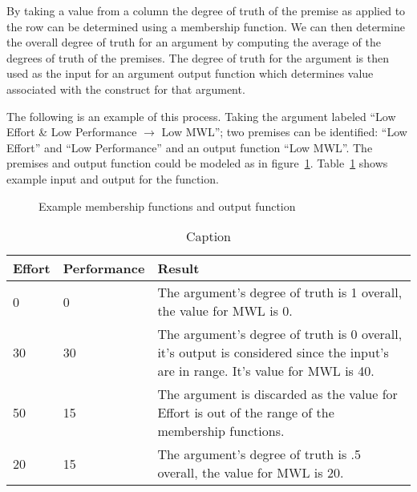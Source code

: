 By taking a value from a column the degree of truth of the premise as applied to the row can be determined using a membership function. We can then determine the overall degree of truth for an argument by computing the average of the degrees of truth of the premises. The degree of truth for the argument is then used as the input for an argument output function which determines value associated with the construct for that argument.

The following is an example of this process. Taking the argument labeled ``Low Effort \& Low Performance $\rightarrow$ Low MWL''; two premises can be identified: ``Low Effort'' and ``Low Performance'' and an output function ``Low MWL''. The premises and output function could be modeled as in figure~\ref{fig:membership_functions}. Table~\ref{tab:memfunc_ex} shows example input and output for the function. 


\begin{figure}
    \centering
    \hfill
    \caption{Example membership functions and output function}
    \label{fig:membership_functions}
\end{figure}

\begin{table}[]
\begin{center}
  \begin{tabular}{ | l | l | p{8cm} |}
    \hline 
Effort & Performance & Result \\ \hline
0 & 0 & The argument's degree of truth is 1 overall, the value for MWL is 0. \\
30 & 30 & The argument's degree of truth is 0 overall, it's output is considered since the input's are in range. It's value for MWL is 40. \\
50 & 15 & The argument is discarded as the value for Effort is out of the range of the membership functions. \\
20 & 15 & The argument's degree of truth is .5 overall, the value for MWL is 20. \\
    \hline
  \end{tabular}
\end{center}
\caption{Caption}
\label{tab:memfunc_ex}
\end{table}

